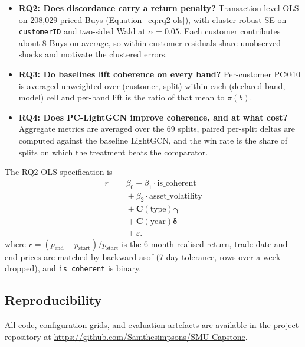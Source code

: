 \begin{itemize}
    \item \textbf{RQ2: Does discordance carry a return penalty?} Transaction-level OLS on 208{,}029 priced Buys (Equation~\ref{eq:rq2-ols}), with cluster-robust SE on \texttt{customerID} and two-sided Wald at $\alpha = 0.05$. Each customer contributes about 8 Buys on average, so within-customer residuals share unobserved shocks and motivate the clustered errors.
    \item \textbf{RQ3: Do baselines lift coherence on every band?} Per-customer PC@10 is averaged unweighted over (customer, split) within each (declared band, model) cell and per-band lift is the ratio of that mean to $\pi(b)$.
    \item \textbf{RQ4: Does PC-LightGCN improve coherence, and at what cost?} Aggregate metrics are averaged over the 69 splits, paired per-split deltas are computed against the baseline LightGCN, and the win rate is the share of splits on which the treatment beats the comparator.
\end{itemize}

The RQ2 OLS specification is
\begin{equation}
\label{eq:rq2-ols}
\begin{split}
r ={}& \beta_0 + \beta_1 \cdot \text{is\_coherent} \\
    &{}+ \beta_2 \cdot \text{asset\_volatility} \\
    &{}+ \mathbf{C}(\text{type})\boldsymbol{\gamma} \\
    &{}+ \mathbf{C}(\text{year})\boldsymbol{\delta} \\
    &{}+ \varepsilon.
\end{split}
\end{equation}
where $r = (p_{\text{end}} - p_{\text{start}})/p_{\text{start}}$ is the 6-month realised return, trade-date and end prices are matched by backward-asof (7-day tolerance, rows over a week dropped), and \texttt{is\_coherent} is binary.

\subsection{Reproducibility}
\label{sec:setup:reproducibility}

All code, configuration grids, and evaluation artefacts are available in the project repository at \url{https://github.com/Samthesimpsons/SMU-Capstone}.

